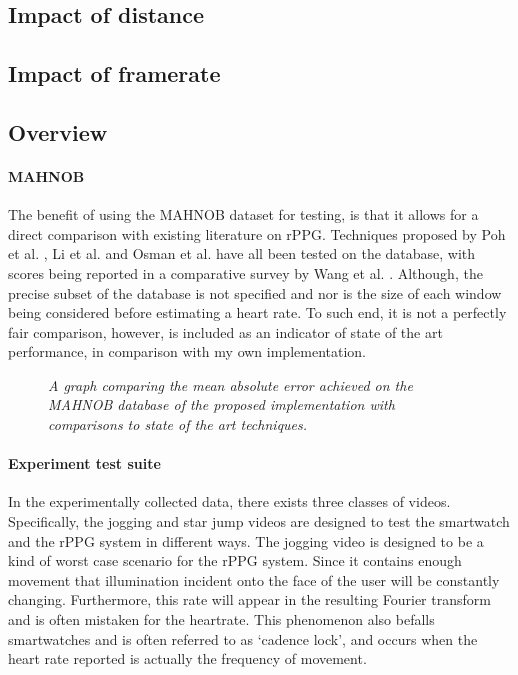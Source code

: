 \subsection{Impact of distance}

\subsection{Impact of framerate}

\subsection{Overview}



\paragraph{MAHNOB}
The benefit of using the MAHNOB dataset for testing, is that it allows for a direct comparison with existing literature on rPPG.
Techniques proposed by Poh et al. \cite{poh}, Li et al. \cite{li} and Osman et al. \cite{osman} have all been tested on the database, with 
scores being reported in a comparative survey by Wang et al. \cite{comparative}.
Although, the precise subset of the database is not specified and nor is the size of each window being considered before estimating a heart rate.
To such end, it is not a perfectly fair comparison, however, is included as an indicator of state of the art performance, in comparison with my own implementation.

\begin{figure}
    \centering
    \scalebox{0.6}{}
   \caption{\textit{A graph comparing the mean absolute error achieved on the MAHNOB database of the proposed implementation with comparisons to state of the art techniques.}}
\end{figure}
\paragraph{Experiment test suite}
In the experimentally collected data, there exists three classes of videos. Specifically, the jogging and star jump videos are designed to test the smartwatch and 
the rPPG system in different ways. The jogging video is designed to be a kind of worst case scenario for the rPPG system. Since it contains enough movement that
illumination incident onto the face of the user will be constantly changing. Furthermore, this rate will appear in the resulting Fourier transform and is often mistaken
for the heartrate. This phenomenon also befalls smartwatches and is often referred to as `cadence lock', and occurs when the heart rate reported is actually the frequency 
of movement.

